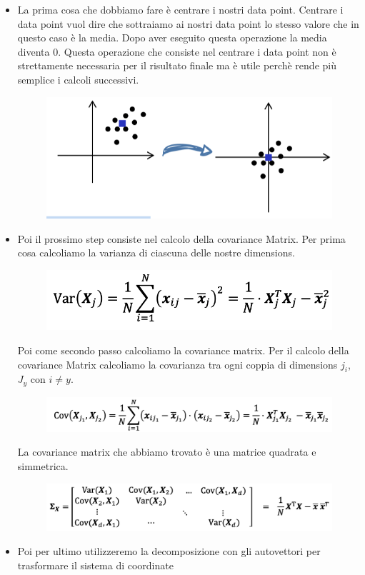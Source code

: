 \documentclass[14pt]{extreport}
\begin{document}
\begin{itemize}
	\item La prima cosa che dobbiamo fare è centrare i nostri data point. Centrare i data point vuol dire che sottraiamo 
	ai nostri data point lo stesso valore che in questo caso è la media. 
	Dopo aver eseguito questa operazione la media diventa 0.
	Questa operazione che consiste nel centrare i data point non è strettamente 
	necessaria per il risultato finale ma è utile perchè rende più semplice i calcoli successivi.

	\begin{figure}[H] 
	\centering
	\includegraphics[width=0.7\linewidth]{444.jpeg}
	\end{figure}

	\item Poi il prossimo step consiste nel calcolo della covariance Matrix. Per prima cosa calcoliamo la varianza di ciascuna
	delle nostre dimensions. 
	\begin{figure}[H] 
	\centering
	\includegraphics[width=0.7\linewidth]{445.jpeg}
	\end{figure}
	Poi come secondo passo calcoliamo la covariance matrix. Per il calcolo della covariance Matrix calcoliamo la covarianza tra 
	ogni coppia di dimensions $j_i$, $J_y$ con $i \not = y$.
	\begin{figure}[H] 
	\centering
	\includegraphics[width=0.7\linewidth]{446.jpeg}
	\end{figure}
	La covariance matrix che abbiamo trovato è una matrice quadrata e simmetrica.
	\begin{figure}[H] 
	\centering
	\includegraphics[width=0.7\linewidth]{447.jpeg}
	\end{figure}
	\item Poi per ultimo utilizzeremo la decomposizione con gli autovettori per trasformare il sistema di coordinate
\end{itemize}
\end{document}
